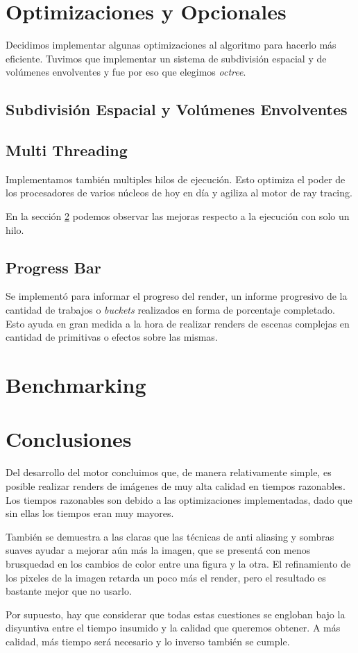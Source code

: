 \documentclass[a4paper,10pt]{article}
\begin{document}
\section{Optimizaciones y Opcionales}
Decidimos implementar algunas optimizaciones al algoritmo para hacerlo m\'as
eficiente.  Tuvimos que implementar un sistema de subdivisi\'on espacial y de
vol\'umenes envolventes y fue por eso que elegimos \emph{octree}.
\subsection{Subdivisi\'on Espacial y Vol\'umenes Envolventes}
\label{octree}


\subsection{Multi Threading}

Implementamos tambi\'en multiples hilos de ejecuci\'on.  Esto optimiza el poder
de los procesadores de varios n\'ucleos de hoy en d\'ia y agiliza al motor de
ray tracing.

En la secci\'on \ref{bench} podemos observar las mejoras respecto a la
ejecuci\'on con solo un hilo.

\subsection{Progress Bar}

Se implement\'o para informar el progreso del render, un informe progresivo de
la cantidad de trabajos o \emph{buckets} realizados en forma de porcentaje
completado. Esto ayuda en gran medida a la hora de realizar renders de escenas
complejas en cantidad de primitivas o efectos sobre las mismas.

\section{Benchmarking}
\label{bench}
\section{Conclusiones}
\label{conc}

Del desarrollo del motor concluimos que, de manera relativamente simple, es
posible realizar renders de im\'agenes de muy alta calidad en tiempos
razonables.  Los tiempos razonables son debido a las optimizaciones
implementadas, dado que sin ellas los tiempos eran muy mayores.

Tambi\'en se demuestra a las claras que las t\'ecnicas de anti aliasing y
sombras suaves ayudar a mejorar a\'un m\'as la imagen, que se present\'a con
menos brusquedad en los cambios de color entre una figura y la otra.  El
refinamiento de los pixeles de la imagen retarda un poco m\'as el render, pero
el resultado es bastante mejor que no usarlo.

Por supuesto, hay que considerar que todas estas cuestiones se engloban bajo la
disyuntiva entre el tiempo insumido y la calidad que queremos obtener.  A m\'as
calidad, m\'as tiempo ser\'a necesario y lo inverso tambi\'en se cumple.
\end{document}
